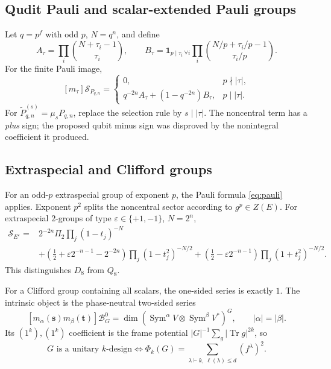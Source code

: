 \documentclass[10pt]{article}
\newcommand{\Sym}{\operatorname{Sym}}
\newcommand{\Tr}{\operatorname{Tr}}
\newcommand{\MGF}{\mathcal S}
\begin{document}
\subsection{Qudit Pauli and scalar-extended Pauli groups}
Let $q=p^f$ with odd $p$, $N=q^n$, and define
\[
A_\tau=\prod_i\binom{N+\tau_i-1}{\tau_i},\qquad
B_\tau=\mathbf1_{p\mid\tau_i\ \forall i}
\prod_i\binom{N/p+\tau_i/p-1}{\tau_i/p}.
\]
For the finite Pauli image,
\begin{equation}\label{eq:pauli}
\boxed{[m_\tau]\MGF_{P_{q,n}}=
\begin{cases}0,&p\nmid|\tau|,\\q^{-2n}A_\tau+(1-q^{-2n})B_\tau,&p\mid|\tau|.
\end{cases}}
\end{equation}
For $\widetilde P_{q,n}^{(s)}=\mu_sP_{q,n}$, replace the selection rule by
$s\mid|\tau|$. The noncentral term has a \emph{plus} sign; the proposed
qubit minus sign was disproved by the nonintegral coefficient it produced.

\subsection{Extraspecial and Clifford groups}
For an odd-$p$ extraspecial group of exponent $p$, the Pauli formula
\eqref{eq:pauli} applies. Exponent $p^2$ splits the noncentral sector according
to $g^p\in Z(E)$. For extraspecial $2$-groups of type
$\varepsilon\in\{+1,-1\}$, $N=2^n$,
\begin{align*}
\MGF_{E^\varepsilon}={}&2^{-2n}\Pi_2\prod_j(1-t_j)^{-N}\\
&+(\tfrac12+\varepsilon2^{-n-1}-2^{-2n})\prod_j(1-t_j^2)^{-N/2}
+(\tfrac12-\varepsilon2^{-n-1})\prod_j(1+t_j^2)^{-N/2}.
\end{align*}
This distinguishes $D_8$ from $Q_8$.

For a Clifford group containing all scalars, the one-sided series is exactly
$1$. The intrinsic object is the phase-neutral two-sided series
\[
[m_\alpha(\mathbf s)m_\beta(\mathbf t)]\mathcal B_G^0
=\dim(\Sym^\alpha V\otimes\Sym^\beta V^*)^G,
\qquad |\alpha|=|\beta|.
\]
Its $(1^k),(1^k)$ coefficient is the frame potential
$|G|^{-1}\sum_g|\Tr g|^{2k}$, so
\[
G\text{ is a unitary }k\text{-design}\iff
\Phi_k(G)=\sum_{\lambda\vdash k,\ \ell(\lambda)\le d}(f^\lambda)^2.
\]
\end{document}
